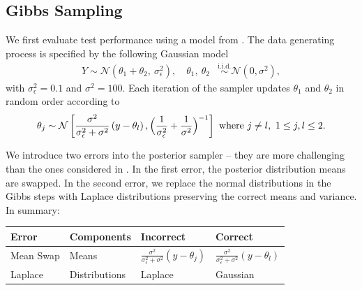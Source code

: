 \documentclass{article}
\begin{document}
\subsection{Gibbs Sampling}
We first evaluate test performance using a model from \cite{gandy_unit_2020}. 
The data generating process is specified by the following Gaussian model
\begin{align}
    Y \sim \mathcal{N}(\theta_1+\theta_2,\ \sigma^2_{\epsilon}),\quad  \theta_1,\ \theta_2 &\overset{\mathrm{i.i.d.}}{\sim}\mathcal{N}(0, \sigma^2), 
    \label{eq:ex1}
\end{align}
with $\sigma_{\epsilon}^{2}=0.1$ and $\sigma^{2}=100$. Each iteration of the sampler updates $\theta_{1}$ and $\theta_{2}$ in random order according to 
\begin{align}
\theta_{j} \sim \mathcal{N}\left[
\frac{\sigma^{2}}{\sigma_{\epsilon}^{2}+\sigma^{2}}\left(y-\theta_{l}\right)
, \Bigl(\frac{1}{\sigma_{\epsilon}^{2}}+\frac{1}{\sigma^{2}}\Bigr)^{-1}\right]\ \text{where } j \neq l,\ 1\leq j,l\leq 2.
\end{align}

We introduce two errors into the posterior sampler -- they are more challenging than the ones considered in \cite{gandy_unit_2020}. 
In the first error, the posterior distribution means are swapped. In the second error, we replace the normal distributions in the Gibbs steps with Laplace distributions preserving the correct means and variance. In summary:
\begin{center}
    \begin{tabular}{llll}
          Error & Components & Incorrect & Correct \\
    \midrule  
         Mean Swap & Means &  $\frac{\sigma^{2}}{\sigma_{\epsilon}^{2}+\sigma^{2}}\left(y-\theta_{j}\right)$ & $\frac{\sigma^{2}}{\sigma_{\epsilon}^{2}+\sigma^{2}}\left(y-\theta_{l}\right)$\\
         Laplace & Distributions & Laplace & Gaussian \\
    \end{tabular}
\end{center}
\end{document}
